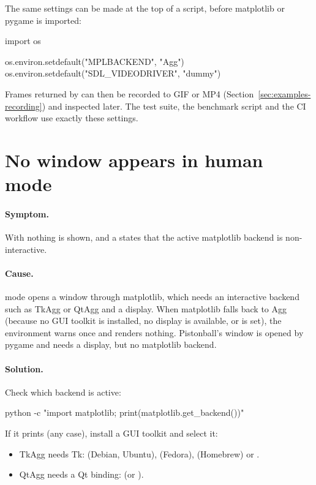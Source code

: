 The same settings can be made at the top of a script, before matplotlib or
pygame is imported:

\begin{pycode}
import os

os.environ.setdefault("MPLBACKEND", "Agg")
os.environ.setdefault("SDL_VIDEODRIVER", "dummy")
\end{pycode}

Frames returned by  can then be recorded to GIF or MP4
(Section~\ref{sec:examples-recording}) and inspected later. The test suite,
the benchmark script and the CI workflow use exactly these settings.

\section{No window appears in human mode}\label{sec:trouble-human}

\paragraph{Symptom.} With  nothing is shown, and
a  states that the active matplotlib backend is
non-interactive.

\paragraph{Cause.}  mode opens a window through matplotlib,
which needs an interactive backend such as TkAgg or QtAgg and a display.
When matplotlib falls back to Agg (because no GUI toolkit is installed, no
display is available, or  is set), the environment warns
once and renders nothing. Pistonball's window is opened by pygame and needs a
display, but no matplotlib backend.

\paragraph{Solution.} Check which backend is active:

\begin{shellcode}
python -c "import matplotlib; print(matplotlib.get_backend())"
\end{shellcode}

If it prints  (any case), install a GUI toolkit and select it:

\begin{itemize}
  \item TkAgg needs Tk:  (Debian,
    Ubuntu),  (Fedora),
     (Homebrew) or .
  \item QtAgg needs a Qt binding:  (or ).
\end{itemize}


